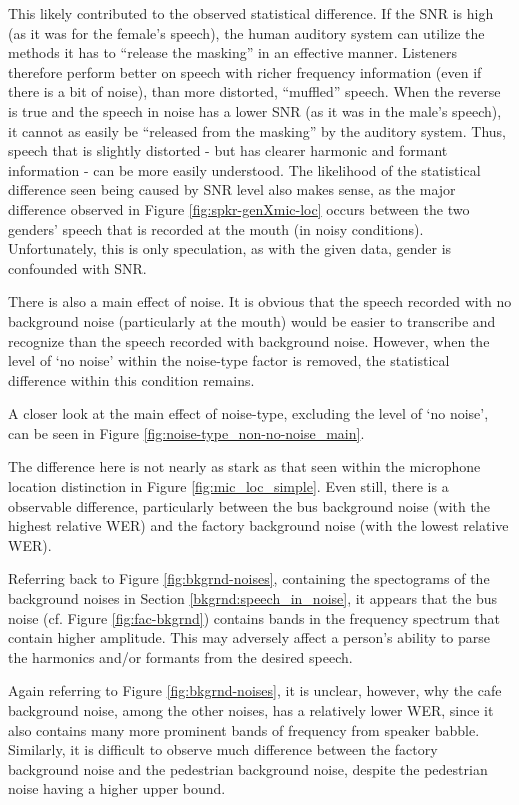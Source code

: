 \documentclass[dissertation,copyright]{uathesis}
\begin{document}
This likely contributed to the observed statistical difference.  If the SNR is high (as it was for the female's speech), the human auditory system can utilize the methods it has to ``release the masking'' in an effective manner.  Listeners therefore perform better on speech with richer frequency information (even if there is a bit of noise), than more distorted, ``muffled'' speech.  When the reverse is true and the speech in noise has a lower SNR (as it was in the male's speech), it cannot as easily be ``released from the masking'' by the auditory system.  Thus, speech that is slightly distorted - but has clearer harmonic and formant information - can be more easily understood.  The likelihood of the statistical difference seen being caused by SNR level also makes sense, as the major difference observed in Figure \ref{fig:spkr-genXmic-loc} occurs between the two genders' speech that is recorded at the mouth (in noisy conditions).  Unfortunately, this is only speculation, as with the given data, gender is confounded with SNR.

There is also a main effect of noise.  It is obvious that the speech recorded with no background noise (particularly at the mouth) would be easier to transcribe and recognize than the speech recorded with background noise.  However, when the level of `no noise' within the noise-type factor is removed, the statistical difference within this condition remains.

A closer look at the main effect of noise-type, excluding the level of `no noise', can be seen in Figure \ref{fig:noise-type_non-no-noise_main}.

The difference here is not nearly as stark as that seen within the microphone location distinction in Figure \ref{fig:mic_loc_simple}.  Even still, there is a observable difference, particularly between the bus background noise (with the highest relative WER) and the factory background noise (with the lowest relative WER).

Referring back to Figure \ref{fig:bkgrnd-noises}, containing the spectograms of the background noises in Section \ref{bkgrnd:speech_in_noise}, it appears that the bus noise (cf. Figure \ref{fig:fac-bkgrnd}) contains bands in the frequency spectrum that contain higher amplitude.
This may adversely affect a person's ability to parse the harmonics and/or formants from the desired speech. 

Again referring to Figure \ref{fig:bkgrnd-noises}, it is unclear, however, why the cafe background noise, among the other noises, has a relatively lower WER, since it also contains many more prominent bands of frequency from speaker babble. 
Similarly, it is difficult to observe much difference between the factory background noise and the pedestrian background noise, despite the pedestrian noise having a higher upper bound.
\end{document}
